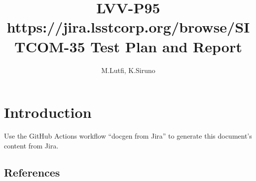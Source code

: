 \documentclass[DM,lsstdraft,toc]{lsstdoc}
\begin{document}
\def\milestoneName{https://jira.lsstcorp.org/browse/SITCOM-35}
\def\milestoneId{LVV-P95}
\def\product{Data Management}


\title{LVV-P95 https://jira.lsstcorp.org/browse/SITCOM-35 Test Plan and Report}
\setDocRef{\lsstDocType-\lsstDocNum}
\date{\vcsDate}
\author{M.Lutfi, K.Siruno}




\maketitle

\section{Introduction}
Use the GitHub Actions workflow ``docgen from Jira'' to generate this document's content from Jira.

\subsection{References}
\label{sect:references}
\renewcommand{\refname}{}




\end{document}
